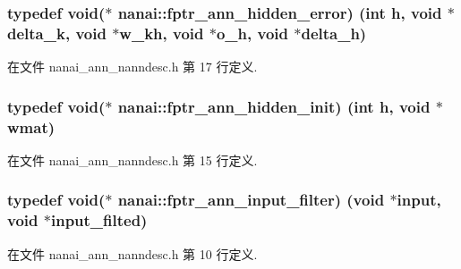 \hypertarget{namespacenanai_aa8cd8d38cbd0a27e2818f132a3cfa2a2}{}
\subsubsection[{fptr\+\_\+ann\+\_\+hidden\+\_\+error}]{\setlength{\rightskip}{0pt plus 5cm}typedef void($\ast$ nanai\+::fptr\+\_\+ann\+\_\+hidden\+\_\+error) (int h, void $\ast$delta\+\_\+k, void $\ast$w\+\_\+kh, void $\ast$o\+\_\+h, void $\ast$delta\+\_\+h)}\label{namespacenanai_aa8cd8d38cbd0a27e2818f132a3cfa2a2}


在文件 nanai\+\_\+ann\+\_\+nanndesc.\+h 第 17 行定义.

\hypertarget{namespacenanai_a5fc4ff646e59919360af1ef410fe9671}{}
\subsubsection[{fptr\+\_\+ann\+\_\+hidden\+\_\+init}]{\setlength{\rightskip}{0pt plus 5cm}typedef void($\ast$ nanai\+::fptr\+\_\+ann\+\_\+hidden\+\_\+init) (int h, void $\ast$wmat)}\label{namespacenanai_a5fc4ff646e59919360af1ef410fe9671}


在文件 nanai\+\_\+ann\+\_\+nanndesc.\+h 第 15 行定义.

\hypertarget{namespacenanai_a681d28f80aa95597ffc268b3b01abcfc}{}
\subsubsection[{fptr\+\_\+ann\+\_\+input\+\_\+filter}]{\setlength{\rightskip}{0pt plus 5cm}typedef void($\ast$ nanai\+::fptr\+\_\+ann\+\_\+input\+\_\+filter) (void $\ast$input, void $\ast$input\+\_\+filted)}\label{namespacenanai_a681d28f80aa95597ffc268b3b01abcfc}


在文件 nanai\+\_\+ann\+\_\+nanndesc.\+h 第 10 行定义.

\hypertarget{namespacenanai_a3be739c74db7d7304ff72dbcefbdc046}{}
